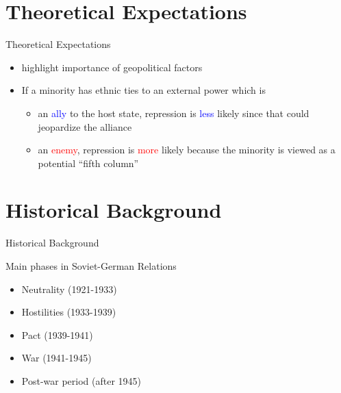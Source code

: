 \documentclass[11pt]{beamer}
\begin{document}
\section{Theoretical Expectations}
\begin{frame}{Theoretical Expectations}
\begin{itemize}
    \item  \citet{mylonas_politics_2013, butt_secession_2017} highlight importance of geopolitical factors 
    \item If a minority has ethnic ties to an external power
     which is  
    \begin{itemize}
        \item an \textcolor{blue}{ally}  to the host state, repression is \textcolor{blue}{less} likely since that could jeopardize the alliance
        \item an \textcolor{red}{enemy}, repression is \textcolor{red}{more}  likely because the minority is viewed as a potential \enquote{fifth column}

    \end{itemize}
    
\end{itemize}
\end{frame}

\section{Historical Background}
\begin{frame}{Historical Background}
 \begin{block}{Main phases in Soviet-German Relations}
    {
        \begin{itemize}
        \item Neutrality (1921-1933) 
        \item Hostilities (1933-1939)
        \item Pact (1939-1941)
        \item War (1941-1945)
        \item Post-war period (after 1945)
        \end{itemize}
    }
    \end{block}
\end{frame}
\end{document}
